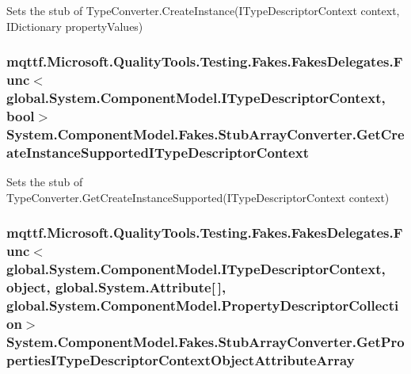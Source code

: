 Sets the stub of Type\-Converter.\-Create\-Instance(\-I\-Type\-Descriptor\-Context context, I\-Dictionary property\-Values)

\hypertarget{class_system_1_1_component_model_1_1_fakes_1_1_stub_array_converter_a1c86f6eed73e680b941c3dc9cdc1c964}{
\subsubsection[{Get\-Create\-Instance\-Supported\-I\-Type\-Descriptor\-Context}]{\setlength{\rightskip}{0pt plus 5cm}mqttf.\-Microsoft.\-Quality\-Tools.\-Testing.\-Fakes.\-Fakes\-Delegates.\-Func$<$global.\-System.\-Component\-Model.\-I\-Type\-Descriptor\-Context, bool$>$ System.\-Component\-Model.\-Fakes.\-Stub\-Array\-Converter.\-Get\-Create\-Instance\-Supported\-I\-Type\-Descriptor\-Context}}\label{class_system_1_1_component_model_1_1_fakes_1_1_stub_array_converter_a1c86f6eed73e680b941c3dc9cdc1c964}


Sets the stub of Type\-Converter.\-Get\-Create\-Instance\-Supported(\-I\-Type\-Descriptor\-Context context)

\hypertarget{class_system_1_1_component_model_1_1_fakes_1_1_stub_array_converter_a4b7d38c4f000d3b9a3b0215e98cb1324}{
\subsubsection[{Get\-Properties\-I\-Type\-Descriptor\-Context\-Object\-Attribute\-Array}]{\setlength{\rightskip}{0pt plus 5cm}mqttf.\-Microsoft.\-Quality\-Tools.\-Testing.\-Fakes.\-Fakes\-Delegates.\-Func$<$global.\-System.\-Component\-Model.\-I\-Type\-Descriptor\-Context, object, global.\-System.\-Attribute\mbox{[}$\,$\mbox{]}, global.\-System.\-Component\-Model.\-Property\-Descriptor\-Collection$>$ System.\-Component\-Model.\-Fakes.\-Stub\-Array\-Converter.\-Get\-Properties\-I\-Type\-Descriptor\-Context\-Object\-Attribute\-Array}}\label{class_system_1_1_component_model_1_1_fakes_1_1_stub_array_converter_a4b7d38c4f000d3b9a3b0215e98cb1324}


